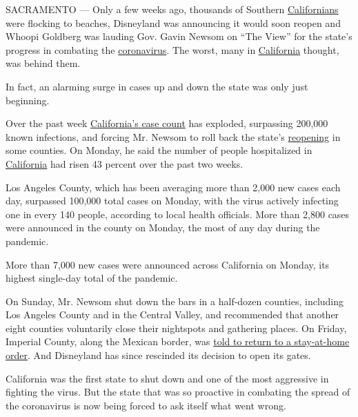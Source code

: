 SACRAMENTO --- Only a few weeks ago, thousands of Southern
\href{https://www.nytimes3xbfgragh.onion/2020/07/16/us/california-coronavirus-cases.html}{Californians}
were flocking to beaches, Disneyland was announcing it would soon reopen
and Whoopi Goldberg was lauding Gov. Gavin Newsom on ``The View'' for
the state's progress in combating the
\href{https://www.nytimes3xbfgragh.onion/2020/07/16/us/california-coronavirus-cases.html}{coronavirus}.
The worst, many in
\href{https://www.nytimes3xbfgragh.onion/2020/07/14/us/california-counties-reopening.html}{California}
thought, was behind them.

In fact, an alarming surge in cases up and down the state was only just
beginning.

Over the past week
\href{https://www.nytimes3xbfgragh.onion/2020/07/23/us/california-covid-19-cases.html}{California's
case count} has exploded, surpassing 200,000 known infections, and
forcing Mr. Newsom to roll back the state's
\href{https://www.nytimes3xbfgragh.onion/2020/06/30/us/coronavirus-california-cases-rising.html}{reopening}
in some counties. On Monday, he said the number of people hospitalized
in
\href{https://www.nytimes3xbfgragh.onion/2020/06/30/us/coronavirus-california-cases-rising.html}{California}
had risen 43 percent over the past two weeks.

Los Angeles County, which has been averaging more than 2,000 new cases
each day, surpassed 100,000 total cases on Monday, with the virus
actively infecting one in every 140 people, according to local health
officials. More than 2,800 cases were announced in the county on Monday,
the most of any day during the pandemic.

More than 7,000 new cases were announced across California on Monday,
its highest single-day total of the pandemic.

On Sunday, Mr. Newsom shut down the bars in a half-dozen counties,
including Los Angeles County and in the Central Valley, and recommended
that another eight counties voluntarily close their nightspots and
gathering places. On Friday, Imperial County, along the Mexican border,
was
\href{https://www.nytimes3xbfgragh.onion/2020/06/26/us/coronavirus-florida-texas-bars-closing.html}{told
to return to a stay-at-home order}. And Disneyland has since rescinded
its decision to open its gates.

California was the first state to shut down and one of the most
aggressive in fighting the virus. But the state that was so proactive in
combating the spread of the coronavirus is now being forced to ask
itself what went wrong.

